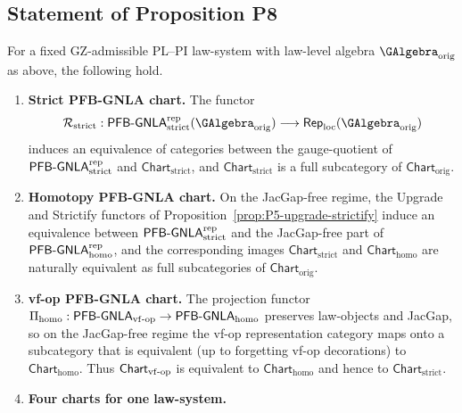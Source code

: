 \documentclass[11pt]{book}
\theoremstyle{plain}
\theoremstyle{definition}
\begin{document}
\subsection*{Statement of Proposition P8}


\begin{proposition}
\label{prop:P8-four-versions-charts}
For a fixed GZ-admissible PL--PI law-system with law-level algebra
\(\GAlgebra_{\mathrm{orig}}\) as above, the following hold.

\begin{enumerate}
  \item[\textnormal{(1)}] \textbf{Strict PFB-GNLA chart.}
    The functor
    \[
      \mathcal{R}_{\mathrm{strict}} :
      \mathsf{PFB\text- GNLA}^{\mathrm{rep}}_{\mathrm{strict}}
        (\GAlgebra_{\mathrm{orig}})
      \longrightarrow
      \mathsf{Rep}_{\mathrm{loc}}(\GAlgebra_{\mathrm{orig}})
    \]
    induces an equivalence of categories between the gauge-quotient
    of \(\mathsf{PFB\text- GNLA}^{\mathrm{rep}}_{\mathrm{strict}}\)
    and \(\mathsf{Chart}_{\mathrm{strict}}\), and
    \(\mathsf{Chart}_{\mathrm{strict}}\) is a full subcategory of
    \(\mathsf{Chart}_{\mathrm{orig}}\).
  \item[\textnormal{(2)}] \textbf{Homotopy PFB-GNLA chart.}
    On the JacGap-free regime, the Upgrade and Strictify functors of
    Proposition~\ref{prop:P5-upgrade-strictify} induce an equivalence
    between
    \(\mathsf{PFB\text- GNLA}^{\mathrm{rep}}_{\mathrm{strict}}\) and
    the JacGap-free part of
    \(\mathsf{PFB\text- GNLA}^{\mathrm{rep}}_{\mathrm{homo}}\), and
    the corresponding images
    \(\mathsf{Chart}_{\mathrm{strict}}\) and
    \(\mathsf{Chart}_{\mathrm{homo}}\) are naturally equivalent as
    full subcategories of \(\mathsf{Chart}_{\mathrm{orig}}\).
  \item[\textnormal{(3)}] \textbf{vf-op PFB-GNLA chart.}
    The projection functor
    \(\Pi_{\mathrm{homo}} : \\ \mathsf{PFB\text- GNLA}_{\mathrm{vf\text- op}}
      \to \mathsf{PFB\text- GNLA}_{\mathrm{homo}}\)
    preserves law-objects and JacGap, so on the JacGap-free regime the
    vf-op representation category maps onto a subcategory that is
    equivalent (up to forgetting vf-op decorations) to
    \(\mathsf{Chart}_{\mathrm{homo}}\).  Thus
    \(\mathsf{Chart}_{\mathrm{vf\text- op}}\) is equivalent to
    \(\mathsf{Chart}_{\mathrm{homo}}\) and hence to
    \(\mathsf{Chart}_{\mathrm{strict}}\).
  \item[\textnormal{(4)}] \textbf{Four charts for one law-system.}

\end{enumerate}
\end{proposition}
\end{document}
